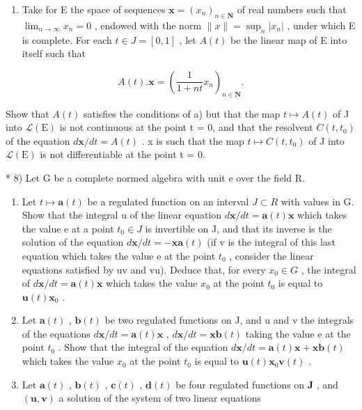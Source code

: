 \begin{enumerate}
\def\labelenumi{\alph{enumi})}
\setcounter{enumi}{1}
\tightlist
\item
  Take for E the space of sequences \(\mathbf{x}=(x_{n})_{n\in\mathbf{N}}\) of real numbers such that \(\lim_{n\to\infty}x_{n}=0\) , endowed with the norm \(\|x\|=\sup_{n}|x_{n}|\) , under which E is complete. For each \(t\in J=[0,1]\) , let \(A(t)\) be the linear map of E into itself such that
\end{enumerate}

\[
A (t). \mathbf {x} = \left(\frac {1}{1 + n t} x _ {n}\right) _ {n \in \mathbf {N}}.
\]

Show that \(A(t)\) satisfies the conditions of a) but that the map \(t \mapsto A(t)\) of J into \(\mathcal{L}(\mathrm{E})\) is not continuous at the point t = 0, and that the resolvent \(C(t, t_0)\) of the equation \(d\mathbf{x}/dt = A(t)\) . x is such that the map \(t \mapsto C(t, t_0)\) of J into \(\mathcal{L}(\mathrm{E})\) is not differentiable at the point t = 0.

* 8) Let G be a complete normed algebra with unit e over the field R.

\begin{enumerate}
\def\labelenumi{\alph{enumi})}
\item
  Let \(t \mapsto \mathbf{a}(t)\) be a regulated function on an interval \(J \subset R\) with values in G. Show that the integral u of the linear equation \(d\mathbf{x}/dt = \mathbf{a}(t)\mathbf{x}\) which takes the value e at a point \(t_0 \in J\) is invertible on J, and that its inverse is the solution of the equation \(d\mathbf{x}/dt = -\mathbf{x}\mathbf{a}(t)\) (if v is the integral of this last equation which takes the value e at the point \(t_0\) , consider the linear equations satisfied by uv and vu). Deduce that, for every \(x_0 \in G\) , the integral of \(d\mathbf{x}/dt = \mathbf{a}(t)\mathbf{x}\) which takes the value \(x_0\) at the point \(t_0\) is equal to \(\mathbf{u}(t)\mathbf{x}_0\) .
\item
  Let \(\mathbf{a}(t)\) , \(\mathbf{b}(t)\) be two regulated functions on J, and u and v the integrals of the equations \(d\mathbf{x}/dt = \mathbf{a}(t)\mathbf{x}\) , \(d\mathbf{x}/dt = \mathbf{x}\mathbf{b}(t)\) taking the value e at the point \(t_{0}\) . Show that the integral of the equation \(d\mathbf{x}/dt = \mathbf{a}(t)\mathbf{x} + \mathbf{x}\mathbf{b}(t)\) which takes the value \(x_{0}\) at the point \(t_{0}\) is equal to \(\mathbf{u}(t)\mathbf{x}_{0}\mathbf{v}(t)\) .
\item
  Let \(\mathbf{a}(t)\) , \(\mathbf{b}(t)\) , \(\mathbf{c}(t)\) , \(\mathbf{d}(t)\) be four regulated functions on \(\mathbf{J}\) , and \((\mathbf{u}, \mathbf{v})\) a solution of the system of two linear equations
\end{enumerate}

